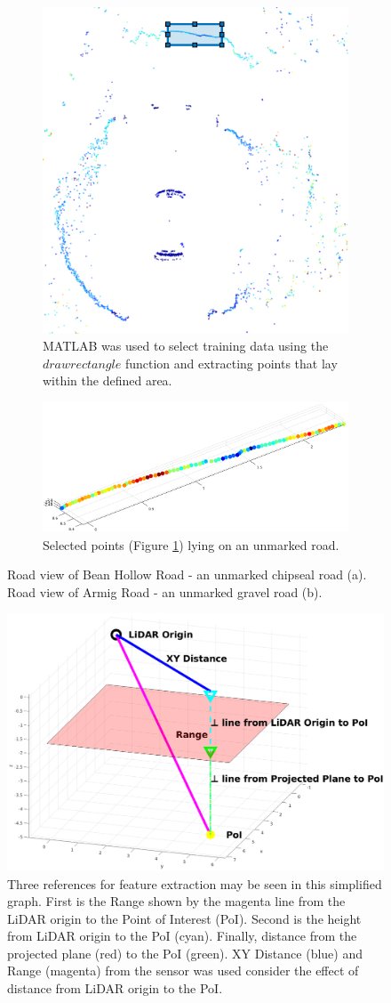 \documentclass[journal,onecolumn]{IEEEtran}
\begin{document}
	\begin{figure}[H]
		\centering
		\begin{subfigure}{0.45\textwidth}
			\centering
			\includegraphics[width=0.5\linewidth]{figures/Rectangle_ROI}
			\caption[Region of Interest Selection]{MATLAB was used to select training data using the $drawrectangle$ function and extracting points that lay within the defined area.}
			\label{fig:Rectangle_ROI}
		\end{subfigure}
		\begin{subfigure}{0.45\textwidth}
			\centering
			\includegraphics[width=0.5\linewidth]{figures/ROI_Points}
			\caption[Points in Region of Interest]{Selected points (Figure \ref{fig:Rectangle_ROI}) lying on an unmarked road.}
			\label{fig:ROI_Points}
		\end{subfigure}
		\caption[Armig Road \& Bean Hollow Road]{Road view of Bean Hollow Road - an unmarked chipseal road (a). Road view of Armig Road - an unmarked gravel road (b).}
		\label{fig:Combined_Things}
	\end{figure}

	\begin{figure}[H]
		\centering
		\includegraphics[width=0.5\linewidth]{figures/xy_vs_range}
		\caption[XY vs Range vs Z Height]{Three references for feature extraction may be seen in this simplified graph. First is the Range shown by the magenta line from the LiDAR origin to the Point of Interest (PoI). Second is the height from  LiDAR origin to the PoI (cyan). Finally, distance from the projected plane (red) to the PoI (green). XY Distance (blue) and Range (magenta) from the sensor was used consider the effect of distance from LiDAR origin to the PoI.}
		\label{fig:xy_vs_range}
	\end{figure}
	
\end{document}
